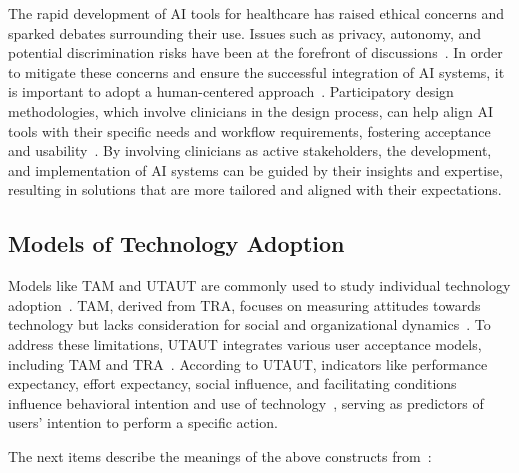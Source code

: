 The rapid development of \ac{AI} tools for healthcare has raised ethical concerns and sparked debates surrounding their use.
Issues such as privacy, autonomy, and potential discrimination risks have been at the forefront of discussions~\cite{CALISTO2022102922}.
In order to mitigate these concerns and ensure the successful integration of \ac{AI} systems, it is important to adopt a human-centered approach~\cite{CALISTO2021102607}.
Participatory design methodologies, which involve clinicians in the design process, can help align \ac{AI} tools with their specific needs and workflow requirements, fostering acceptance and usability~\cite{CALISTO2022102285}.
By involving clinicians as active stakeholders, the development, and implementation of \ac{AI} systems can be guided by their insights and expertise, resulting in solutions that are more tailored and aligned with their expectations.

\subsection{Models of Technology Adoption}
\label{sec:chap004002003}

Models like \ac{TAM} and \ac{UTAUT} are commonly used to study individual technology adoption~\cite{HOEHLE201635, MOORE2022102784}.
\ac{TAM}, derived from \ac{TRA}, focuses on measuring attitudes towards technology but lacks consideration for social and organizational dynamics~\cite{KHALILZADEH2017460}.
To address these limitations, \ac{UTAUT} integrates various user acceptance models, including \ac{TAM} and \ac{TRA}~\cite{CALISTO2022102922}.
According to \ac{UTAUT}, indicators like performance expectancy, effort expectancy, social influence, and facilitating conditions influence behavioral intention and use of technology~\cite{KHALILZADEH2017460}, serving as predictors of users' intention to perform a specific action.

\vspace{2.00mm}

\noindent
The next items describe the meanings of the above constructs from~\cite{CALISTO2022102922}:

\vspace{0.05mm}

